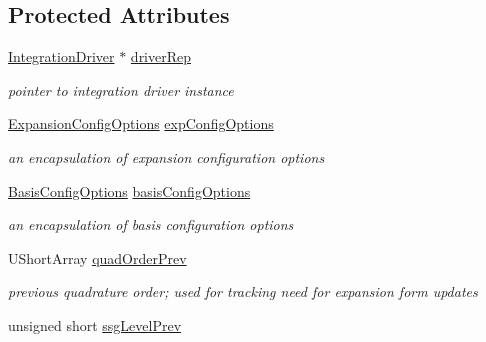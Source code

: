 \subsection*{Protected Attributes}
\begin{DoxyCompactItemize}
\item 
\hyperlink{classPecos_1_1IntegrationDriver}{Integration\+Driver} $\ast$ \hyperlink{classPecos_1_1SharedPolyApproxData_af5db1260af15e88b5451fb5c39c66161}{driver\+Rep}\label{classPecos_1_1SharedPolyApproxData_af5db1260af15e88b5451fb5c39c66161}

\begin{DoxyCompactList}\small\item\em pointer to integration driver instance \end{DoxyCompactList}\item 
\hyperlink{classPecos_1_1ExpansionConfigOptions}{Expansion\+Config\+Options} \hyperlink{classPecos_1_1SharedPolyApproxData_af0c08a7a3ab7975a23a705e49a8b5fc5}{exp\+Config\+Options}\label{classPecos_1_1SharedPolyApproxData_af0c08a7a3ab7975a23a705e49a8b5fc5}

\begin{DoxyCompactList}\small\item\em an encapsulation of expansion configuration options \end{DoxyCompactList}\item 
\hyperlink{classPecos_1_1BasisConfigOptions}{Basis\+Config\+Options} \hyperlink{classPecos_1_1SharedPolyApproxData_a9b7da1692c3f10e5ebcfe12fdc17b49a}{basis\+Config\+Options}\label{classPecos_1_1SharedPolyApproxData_a9b7da1692c3f10e5ebcfe12fdc17b49a}

\begin{DoxyCompactList}\small\item\em an encapsulation of basis configuration options \end{DoxyCompactList}\item 
U\+Short\+Array \hyperlink{classPecos_1_1SharedPolyApproxData_a7bf0a5f8662f367dfb3efb3b52e42da2}{quad\+Order\+Prev}\label{classPecos_1_1SharedPolyApproxData_a7bf0a5f8662f367dfb3efb3b52e42da2}

\begin{DoxyCompactList}\small\item\em previous quadrature order; used for tracking need for expansion form updates \end{DoxyCompactList}\item 
unsigned short \hyperlink{classPecos_1_1SharedPolyApproxData_a18a85b33e2965777c8dcef1534f34177}{ssg\+Level\+Prev}\label{classPecos_1_1SharedPolyApproxData_a18a85b33e2965777c8dcef1534f34177}


\end{DoxyCompactItemize}
